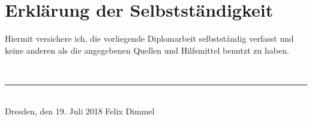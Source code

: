 
\chapter*{Erklärung der Selbstständigkeit}
\thispagestyle{empty}
Hiermit versichere ich, die vorliegende Diplomarbeit selbstständig verfasst und keine
anderen als die angegebenen Quellen und Hilfsmittel benutzt zu haben.

\mbox{}\vspace{2\baselineskip}\\

\hfill\noindent\rule{5cm}{0.2pt}\\
Dresden, den 19. Juli 2018 \hfill Felix Dimmel

\clearpage\mbox{}\thispagestyle{empty}

